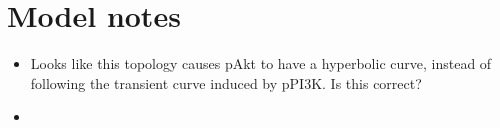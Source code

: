 \documentclass{article}
\begin{document}
    \section{Model notes}
    \begin{itemize}
        \item Looks like this topology causes pAkt to have a hyperbolic curve, instead of following the transient curve induced by pPI3K. Is this correct?
        \item
    \end{itemize}

\end{document}
